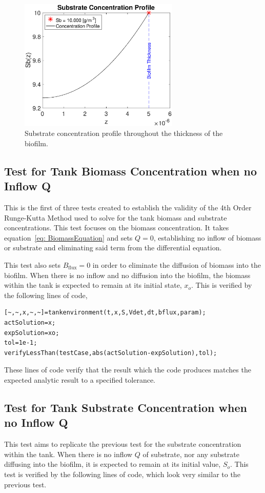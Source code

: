 \documentclass[letterpaper, twoside]{article}
\numberwithin{equation}{section}
\begin{document}
\begin{figure}[H]
  \centering
  \includegraphics[read=eps, width=3in]{BoundaryLayer_Figure1.eps}
  \caption{Substrate concentration profile throughout the thickness of the biofilm.}
\end{figure}

\subsection{Test for Tank Biomass Concentration when no Inflow Q}
This is the first of three tests created to establish the validity of the 4th Order Runge-Kutta Method used to solve for the tank biomass and substrate concentrations. This test focuses on the biomass concentration. It takes equation~\ref{eq: BiomassEquation} and sets $Q=0$, establishing no inflow of biomass or substrate and eliminating said term from the differential equation. 

This test also sets $B_\mathrm{flux}=0$ in order to eliminate the diffusion of biomass into the biofilm. 
When there is no inflow and no diffusion into the biofilm, the biomass within the tank is expected to remain at its initial state, $x_o$. This is verified by the following lines of code,

\begin{lstlisting}
[~,~,x,~,~]=tankenvironment(t,x,S,Vdet,dt,bflux,param);
actSolution=x;
expSolution=xo;
tol=1e-1;
verifyLessThan(testCase,abs(actSolution-expSolution),tol);
\end{lstlisting}

These lines of code verify that the result which the code produces matches the expected analytic result to a specified tolerance.

\subsection{Test for Tank Substrate Concentration when no Inflow Q}
This test aims to replicate the previous test for the substrate concentration within the tank. When there is no inflow $Q$ of substrate, nor any substrate diffusing into the biofilm, it is expected to remain at its initial value, $S_o$. This test is verified by the following lines of code, which look very similar to the previous test.
\end{document}

